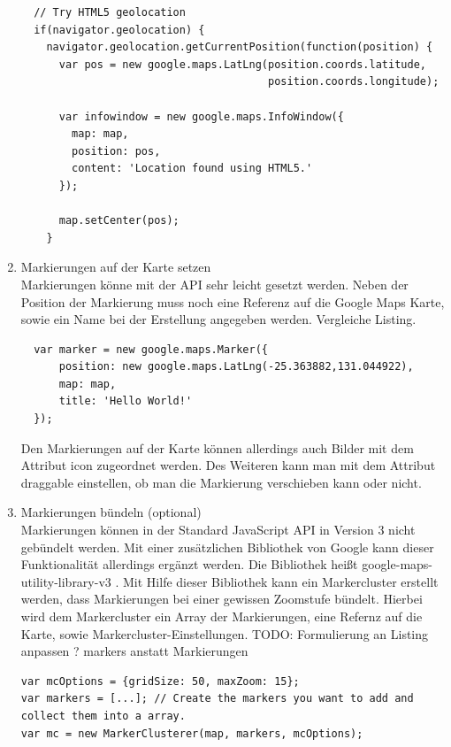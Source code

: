 \begin{enumerate}
\begin{lstlisting}
  // Try HTML5 geolocation
  if(navigator.geolocation) {
    navigator.geolocation.getCurrentPosition(function(position) {
      var pos = new google.maps.LatLng(position.coords.latitude,
                                       position.coords.longitude);

      var infowindow = new google.maps.InfoWindow({
        map: map,
        position: pos,
        content: 'Location found using HTML5.'
      });

      map.setCenter(pos);
    }
\end{lstlisting} \cite[Codebeispiel Geolocation]{googlemaps}

\item Markierungen auf der Karte setzen\\
Markierungen könne mit der API sehr leicht gesetzt werden. Neben der Position der Markierung muss noch eine Referenz auf die Google Maps Karte, sowie ein Name bei der Erstellung angegeben werden. Vergleiche Listing.

\begin{lstlisting}
  var marker = new google.maps.Marker({
      position: new google.maps.LatLng(-25.363882,131.044922),
      map: map,
      title: 'Hello World!'
  });

\end{lstlisting} \cite[Codebeispiel Simple Markers]{googlemaps}

Den Markierungen auf der Karte können allerdings auch Bilder mit dem Attribut \glqq icon \grqq zugeordnet werden. Des Weiteren kann man mit dem Attribut \glqq draggable \grqq einstellen, ob man die Markierung verschieben kann oder nicht.

\item Markierungen bündeln (optional)\\
Markierungen können in der Standard JavaScript API in Version 3 nicht gebündelt werden. 
Mit einer zusätzlichen Bibliothek  von Google kann dieser Funktionalität allerdings ergänzt werden. Die Bibliothek heißt \glqq google-maps-utility-library-v3 \grqq. 
Mit Hilfe dieser Bibliothek kann ein \glqq Markercluster \grqq erstellt werden, dass Markierungen bei einer gewissen Zoomstufe bündelt. Hierbei wird dem Markercluster ein Array der Markierungen, eine Refernz auf die Karte, sowie Markercluster-Einstellungen.
TODO: Formulierung an Listing anpassen ? markers anstatt Markierungen
\begin{lstlisting}
var mcOptions = {gridSize: 50, maxZoom: 15};
var markers = [...]; // Create the markers you want to add and collect them into a array.
var mc = new MarkerClusterer(map, markers, mcOptions);
\end{lstlisting}
\cite{googlecluster}

\end{enumerate}





